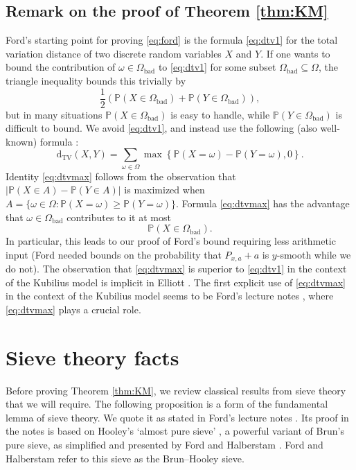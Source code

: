 \documentclass{article}
\theoremstyle{plain}
\theoremstyle{remark}
\newcommand{\PP}{\mathbb{P}}
\newcommand{\dtv}{\mathrm{d}_{\mathrm{TV}}}
\numberwithin{equation}{section}
\begin{document}
\subsection{Remark on the proof of Theorem \ref{thm:KM}}
Ford's starting point for proving \eqref{eq:ford} is the formula \eqref{eq:dtv1} for the total variation distance of two discrete random variables $X$ and $Y$. If one wants to bound the contribution of $\omega \in \Omega_{\mathrm{bad}}$ to \eqref{eq:dtv1} for some subset $\Omega_{\mathrm{bad}}\subseteq \Omega$, the triangle inequality bounds this trivially by
\[ \frac{1}{2}(\PP(X \in \Omega_{\mathrm{bad}}) +\PP(Y \in \Omega_{\mathrm{bad}})),\]
but in many situations $\PP(X \in \Omega_{\mathrm{bad}})$  is easy to handle, while $\PP(Y \in \Omega_{\mathrm{bad}})$ is difficult to bound. We avoid \eqref{eq:dtv1}, and instead use the following (also well-known) formula \cite[Eq.~(3.7)]{ABT}:
\begin{equation}\label{eq:dtvmax}
	\dtv(X,Y)= \sum_{\omega\in \Omega} \max\left\{\PP(X=\omega)-\PP(Y=\omega),0\right\}.
\end{equation}
Identity \eqref{eq:dtvmax} follows from the observation that $|\PP(X\in A)-\PP(Y\in A)|$ is maximized when $A=\{ \omega\in \Omega: \PP(X=\omega)\ge \PP(Y=\omega)\}$. Formula \eqref{eq:dtvmax} has the advantage that $\omega\in \Omega_{\mathrm{bad}}$ contributes to it at most
\[ \PP(X \in \Omega_{\mathrm{bad}}).\]
In particular, this leads to our proof of Ford's bound requiring less arithmetic input (Ford needed bounds on the probability that $P_{x,a}+a$ is $y$-smooth while we do not).
The observation that \eqref{eq:dtvmax} is superior to \eqref{eq:dtv1} in the context of the Kubilius model is implicit in Elliott \cite[pp.~123--126]{Elliott1}. The first explicit use of \eqref{eq:dtvmax} in the context of the Kubilius model seems to be Ford's lecture notes \cite[Ch.~4]{FordNotesAnatomy}, where \eqref{eq:dtvmax} plays a crucial role.
\section{Sieve theory facts}
Before proving Theorem \ref{thm:KM}, we review classical results from sieve theory that we will require. The following proposition is a form of the fundamental lemma of sieve theory. We quote it as stated in Ford's lecture notes \cite{FordNotes}. Its proof in the notes is based on Hooley's `almost pure sieve' \cite{Hooley}, a powerful variant of Brun's pure sieve, as simplified and presented by Ford and Halberstam \cite{FordHalberstam}. Ford and Halberstam refer to this sieve as the Brun--Hooley sieve.
\end{document}
